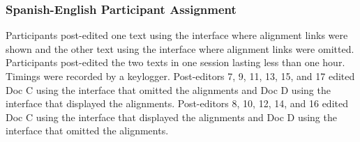 



\subsubsection{Spanish-English Participant Assignment}

Participants post-edited one text using the interface where alignment links were shown and the other text using the interface where alignment links were omitted. 
%
Participants post-edited the two texts in one session lasting less than one hour. 
%
Timings were recorded by a keylogger.
%
Post-editors 7, 9, 11, 13, 15, and 17 edited Doc C using the interface that omitted the alignments and Doc D using the interface that displayed the alignments. 
%
Post-editors 8, 10, 12, 14, and 16 edited Doc C using the interface that displayed the alignments and Doc D using the interface that omitted the alignments.






